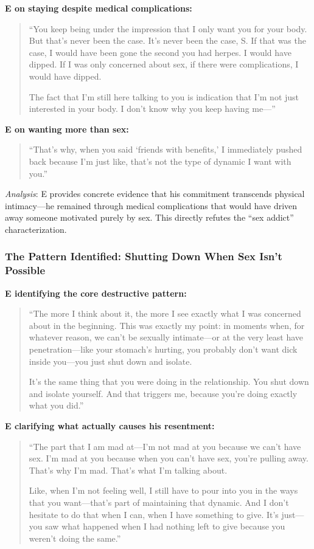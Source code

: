 \documentclass[12pt, letterpaper]{article}
\begin{document}
\textbf{E on staying despite medical complications:}
\begin{quote}
``You keep being under the impression that I only want you for your body. But that's never been the case. It's never been the case, S. If that was the case, I would have been gone the second you had herpes. I would have dipped. If I was only concerned about sex, if there were complications, I would have dipped.

The fact that I'm still here talking to you is indication that I'm not just interested in your body. I don't know why you keep having me---''
\end{quote}

\textbf{E on wanting more than sex:}
\begin{quote}
``That's why, when you said `friends with benefits,' I immediately pushed back because I'm just like, that's not the type of dynamic I want with you.''
\end{quote}

\textit{Analysis}: E provides concrete evidence that his commitment transcends physical intimacy---he remained through medical complications that would have driven away someone motivated purely by sex. This directly refutes the ``sex addict'' characterization.

\subsubsection{The Pattern Identified: Shutting Down When Sex Isn't Possible}

\textbf{E identifying the core destructive pattern:}
\begin{quote}
``The more I think about it, the more I see exactly what I was concerned about in the beginning. This was exactly my point: in moments when, for whatever reason, we can't be sexually intimate---or at the very least have penetration---like your stomach's hurting, you probably don't want dick inside you---you just shut down and isolate.

It's the same thing that you were doing in the relationship. You shut down and isolate yourself. And that triggers me, because you're doing exactly what you did.''
\end{quote}

\textbf{E clarifying what actually causes his resentment:}
\begin{quote}
``The part that I am mad at---I'm not mad at you because we can't have sex. I'm mad at you because when you can't have sex, you're pulling away. That's why I'm mad. That's what I'm talking about.

Like, when I'm not feeling well, I still have to pour into you in the ways that you want---that's part of maintaining that dynamic. And I don't hesitate to do that when I can, when I have something to give. It's just---you saw what happened when I had nothing left to give because you weren't doing the same.''
\end{quote}
\end{document}
